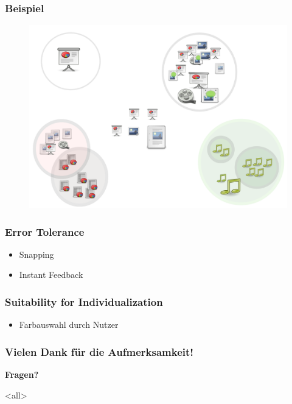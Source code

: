 \begin{frame}

\frametitle{Beispiel}
\label{beispiel}

\begin{figure}[htbp]
\centering
\includegraphics[keepaspectratio,width=\textwidth,height=0.75\textheight]{07.png}
\label{}
\end{figure}


\end{frame}

\begin{frame}

\frametitle{Error Tolerance}
\label{errortolerance}

\begin{itemize}
\item Snapping

\item Instant Feedback

\end{itemize}

\end{frame}

\begin{frame}

\frametitle{Suitability for Individualization}
\label{suitabilityforindividualization}

\begin{itemize}
\item Farbauswahl durch Nutzer

\end{itemize}

\end{frame}

\begin{frame}

\frametitle{Vielen Dank für die Aufmerksamkeit!}
\label{vielendankfrdieaufmerksamkeit}

\textbf{Fragen?}

\end{frame}

\mode<all>


\mode*

